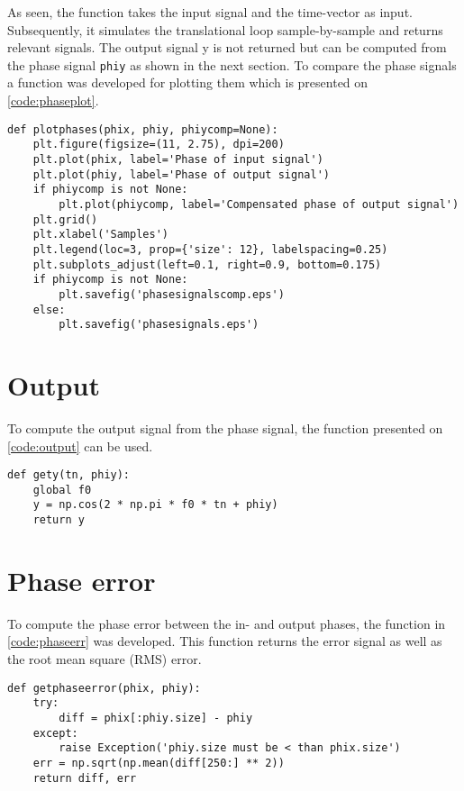 As seen, the function takes the input signal and the time-vector as input. Subsequently, it simulates the translational loop sample-by-sample and returns relevant signals. The output signal y is not returned but can be computed from the phase signal \texttt{phiy} as shown in the next section. To compare the phase signals a function was developed for plotting them which is presented on \cref{code:phaseplot}.

\lstset{language=python,caption=Function for plotting phase signals,label=code:phaseplot}
\begin{lstlisting}
def plotphases(phix, phiy, phiycomp=None):
    plt.figure(figsize=(11, 2.75), dpi=200)
    plt.plot(phix, label='Phase of input signal')
    plt.plot(phiy, label='Phase of output signal')
    if phiycomp is not None:
        plt.plot(phiycomp, label='Compensated phase of output signal')
    plt.grid()
    plt.xlabel('Samples')
    plt.legend(loc=3, prop={'size': 12}, labelspacing=0.25)
    plt.subplots_adjust(left=0.1, right=0.9, bottom=0.175)
    if phiycomp is not None:
        plt.savefig('phasesignalscomp.eps')
    else:
        plt.savefig('phasesignals.eps')
\end{lstlisting}


\section{Output}
To compute the output signal from the phase signal, the function presented on \cref{code:output} can be used.

\lstset{language=python,caption=Function for generation output signal,label=code:output}
\begin{lstlisting}
def gety(tn, phiy):
    global f0
    y = np.cos(2 * np.pi * f0 * tn + phiy)
    return y
\end{lstlisting}


\section{Phase error}
To compute the phase error between the in- and output phases, the function in \cref{code:phaseerr} was developed. This function returns the error signal as well as the root mean square (RMS) error.

\lstset{language=python,caption=Function for computing phase errors,label=code:phaseerr}
\begin{lstlisting}
def getphaseerror(phix, phiy):
    try:
        diff = phix[:phiy.size] - phiy
    except:
        raise Exception('phiy.size must be < than phix.size')
    err = np.sqrt(np.mean(diff[250:] ** 2))
    return diff, err
\end{lstlisting}

